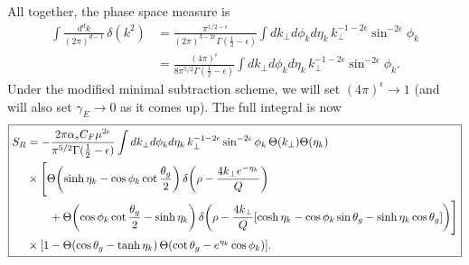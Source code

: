 \documentclass[11pt,twoside,reqno]{amsart}
\theoremstyle{plain}
\theoremstyle{remark}
\theoremstyle{definition}
\theoremstyle{remark}
\theoremstyle{definition}
\theoremstyle{definition}
\begin{document}
	All together, the phase space measure is
	\begin{equation}
	\begin{aligned}
		\int \frac{d^d k}{(2\pi)^{d-1}}\,\delta(k^2) &= \frac{\pi^{1/2-\epsilon}}{(2\pi)^{3-2\epsilon}\Gamma(\frac{1}{2} - \epsilon)}\int dk_\perp d\phi_k d\eta_k \, k_\perp^{-1-2\epsilon} \sin^{-2\epsilon}\phi_k \\
		&= \frac{(4\pi)^\epsilon}{8\pi^{5/2} \Gamma(\frac{1}{2}-\epsilon)} \int dk_\perp d\phi_k d\eta_k\,k_\perp^{-1-2\epsilon} \sin^{-2\epsilon}\phi_k.
	\end{aligned}
	\end{equation}
	Under the modified minimal subtraction scheme, we will set $(4\pi)^\epsilon \to 1$ (and will also set $\gamma_E \to 0$ as it comes up). The full integral is now
	\begin{equation}\label{eq:full integral}
	\boxed{
	\begin{aligned}
		S_R &= -\frac{2\pi\alpha_s C_F\mu^{2\epsilon}}{\pi^{5/2} \Gamma(\frac{1}{2} - \epsilon)} \int dk_\perp d\phi_k d\eta_k\, k_\perp^{-1-2\epsilon} \sin^{-2\epsilon}\phi_k \, \Theta(k_\perp)\Theta(\eta_k) \\
		&\times \Bigg[ \Theta\qty(\sinh\eta_k - \cos\phi_k\cot\frac{\theta_g}{2})\,\delta\qty(\rho - \frac{4 k_\perp e^{-\eta_k}}{Q}) \\
			&\qquad+ \Theta\qty(\cos\phi_k\cot\frac{\theta_g}{2} - \sinh\eta_k)\, \delta\qty(\rho - \frac{4 k_\perp}{Q}\qty[\cosh\eta_k - \cos\phi_k\sin\theta_g - \sinh\eta_k\cos\theta_g])\Bigg] \\
			&\times \qty[1 - \Theta(\cos\theta_g - \tanh\eta_k)\,\Theta\qty(\cot\theta_g - e^{\eta_k}\cos\phi_k)].
	\end{aligned}
	}
	\end{equation}
\end{document}
